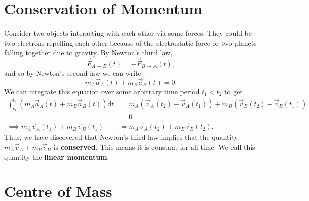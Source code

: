 \documentclass[../classical_mechanics.tex]{subfiles}
\begin{document}
    \section{Conservation of Momentum}
        \paragraph{}
        Consider two objects interacting with each other via some forces.
        They could be two electrons repelling each other because of the electrostatic force or two planets falling together due to gravity.
        By Newton's third law,
        \begin{equation}
            \vec{F}_{A\to B}(t)=-\vec{F}_{B\to A}(t),
        \end{equation}
        and so by Newton's second law we can write
        \begin{equation}\label{eq-COM-acc}
            m_A\vec{a}_A(t)+m_B\vec{a}_B(t)=0.
        \end{equation}
        We can integrate this equation over some arbitrary time period $t_1<t_2$ to get
        \begin{align}
            \int_{t_1}^{t_2}\left(m_A\vec{a}_A(t)+m_B\vec{a}_B(t)\right)\mathrm{d}t &= m_A\left(\vec{v}_A(t_2)-\vec{v}_A(t_1)\right) + m_B\left(\vec{v}_B(t_2)-\vec{v}_B(t_1)\right)\\
            &=0\\
            \implies m_A\vec{v}_A(t_1) + m_B\vec{v}_B(t_1) &= m_A\vec{v}_A(t_2) + m_B\vec{v}_B(t_2).
        \end{align}
        Thus, we have discovered that Newton's third law implies that the quantity $m_A\vec{v}_A+m_B\vec{v}_B$ is \textbf{conserved}.
        This means it is constant for all time. We call this quantity the \textbf{linear momentum}.

    \section{Centre of Mass}
\end{document}
